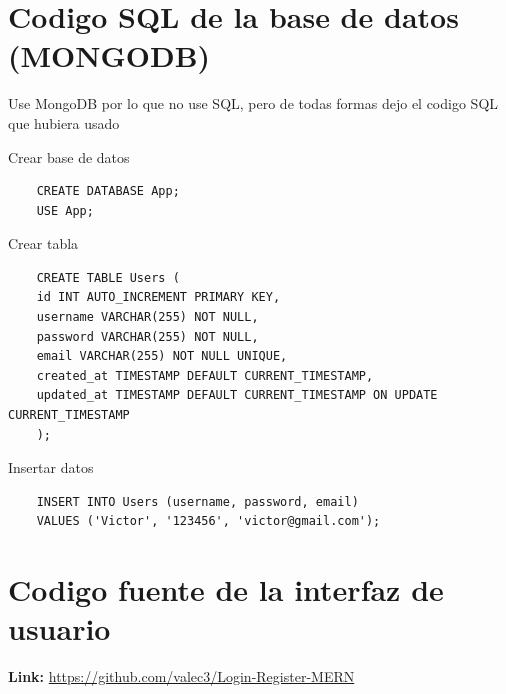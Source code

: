 \documentclass[12pt]{article}
\begin{document}
\section{Codigo SQL de la base de datos (MONGODB)}

\large{Use MongoDB por lo que no use SQL, pero de todas formas dejo el codigo SQL que hubiera usado}

\large{Crear base de datos}
\begin{verbatim}
    CREATE DATABASE App;
    USE App;
\end{verbatim}

\large{Crear tabla}

\begin{verbatim}
    CREATE TABLE Users (
    id INT AUTO_INCREMENT PRIMARY KEY,
    username VARCHAR(255) NOT NULL,
    password VARCHAR(255) NOT NULL,
    email VARCHAR(255) NOT NULL UNIQUE,
    created_at TIMESTAMP DEFAULT CURRENT_TIMESTAMP,
    updated_at TIMESTAMP DEFAULT CURRENT_TIMESTAMP ON UPDATE CURRENT_TIMESTAMP
    );

\end{verbatim}
\large{Insertar datos}
\begin{verbatim}
    INSERT INTO Users (username, password, email) 
    VALUES ('Victor', '123456', 'victor@gmail.com');
\end{verbatim}

\section{Codigo fuente de la interfaz de usuario}

\large \textbf{Link:}
\url{https://github.com/valec3/Login-Register-MERN}

\end{document}
